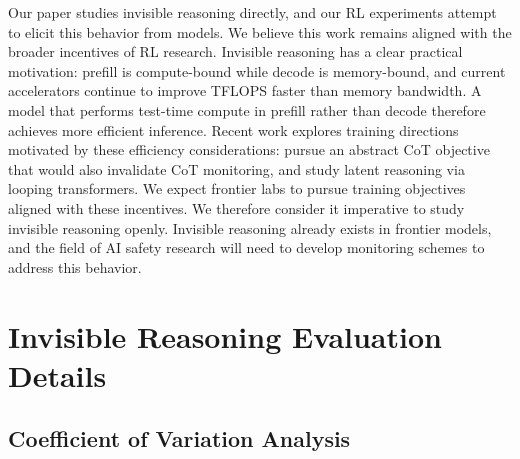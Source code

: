 \documentclass{article}
\begin{document}
Our paper studies invisible reasoning directly, and our RL experiments attempt to elicit this behavior from models. We believe this work remains aligned with the broader incentives of RL research. Invisible reasoning has a clear practical motivation: prefill is compute-bound while decode is memory-bound, and current accelerators continue to improve TFLOPS faster than memory bandwidth. A model that performs test-time compute in prefill rather than decode therefore achieves more efficient inference. Recent work explores training directions motivated by these efficiency considerations: \citet{ramji2026thinkingwordsefficientlatent} pursue an abstract CoT objective that would also invalidate CoT monitoring, and \citet{geiping2026scaling} study latent reasoning via looping transformers. We expect frontier labs to pursue training objectives aligned with these incentives. We therefore consider it imperative to study invisible reasoning openly. Invisible reasoning already exists in frontier models, and the field of AI safety research will need to develop monitoring schemes to address this behavior.








\appendix

\section{Invisible Reasoning Evaluation Details}
\label{app:eval_details}

\subsection{Coefficient of Variation Analysis}
\label{app:cv}
\end{document}
